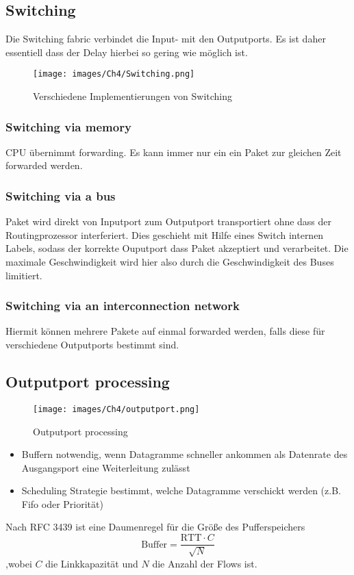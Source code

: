  \subsection{Switching}
 Die Switching fabric verbindet die Input- mit den Outputports. Es ist daher essentiell dass der Delay hierbei so gering wie möglich ist.
 
 \begin{figure}[H]
    \centering
    \texttt{[image: images/Ch4/Switching.png]}
    \caption{Verschiedene Implementierungen von Switching}
    \label{Ch04-switching}
\end{figure}

\subsubsection{Switching via memory}
CPU übernimmt forwarding. Es kann immer nur ein ein Paket zur gleichen Zeit forwarded werden.

\subsubsection{Switching via a bus}
Paket wird direkt von Inputport zum Outputport transportiert ohne dass der Routingprozessor interferiert. Dies geschieht mit Hilfe eines Switch internen Labels, sodass der korrekte Ouputport dass Paket akzeptiert und verarbeitet. Die maximale Geschwindigkeit wird hier also durch die Geschwindigkeit des Buses limitiert.

\subsubsection{Switching via an interconnection network}
Hiermit können mehrere Pakete auf einmal forwarded werden, falls diese für verschiedene Outputports bestimmt sind.

\subsection{Outputport processing}
 \begin{figure}[H]
    \centering
    \texttt{[image: images/Ch4/outputport.png]}
    \caption{Outputport processing}
    \label{Ch04-outputport}
\end{figure}

\begin{itemize}
    \item Buffern notwendig, wenn Datagramme schneller ankommen als Datenrate des Ausgangsport eine Weiterleitung zulässt
    \item Scheduling Strategie bestimmt, welche Datagramme verschickt werden (z.B. Fifo oder Priorität)
\end{itemize}
Nach RFC 3439 ist eine Daumenregel für die Größe des Pufferspeichers
\begin{equation*}
    \text{Buffer} = \frac{\text{RTT}\cdot C}{\sqrt{N}}
\end{equation*}
,wobei $C$ die Linkkapazität und $N$ die Anzahl der Flows ist.

